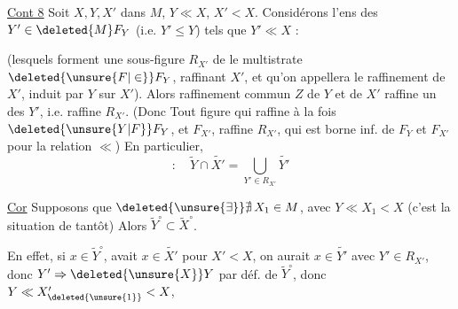 \uline{Cont 8} Soit $X,Y,X'$ dans $M$, $Y\ll X$, $X'<X$. Considérons l'ens des $Y'\in\deleted{ M}F_Y$ (i.e. $Y'\leq Y$) tels que $Y'\ll X$ :

(lesquels forment une sous-figure $R_{X'}$ de le multistrate $\deleted{\unsure{F|\in}}F_Y$,  raffinant $X'$, et qu'on appellera le raffinement de $X'$, induit par $Y$ sur $X'$). Alors  raffinement commun $Z$ de $Y$ et de $X'$ raffine un des $Y'$, i.e. raffine $R_{X'}$. (Donc Tout figure qui raffine à la fois $\deleted{\unsure{Y|F}}F_Y$, et $F_{X'}$, raffine $R_{X'}$, qui est  borne inf. de $F_Y$ et $F_{X'}$ pour la relation $\ll$) En particulier,
\[
 :\quad \widetilde Y\cap\widetilde{X'}=\bigcup_{Y'\in R_{X'}}\widetilde{Y'}
\]

\uline{Cor}  Supposons que $\deleted{\unsure{\exists}}\nexists\,X_1\in M$, avec $Y\ll X_1<X$ (c'est la situation de tantôt) Alors $\widetilde Y^\circ\subset\widetilde X^\circ$.

En effet, si $x\in\widetilde Y^\circ$,  avait $x\in\widetilde{X'}$ pour $X'<X$, on aurait $x\in\widetilde{Y'}$ avec $Y'\in R_{X'}$, donc $Y'\Rightarrow\deleted{\unsure{X}}Y$ par déf. de $\widetilde Y^\circ$, donc $Y\ll X'_{\deleted{\unsure{1}}}<X$, 

